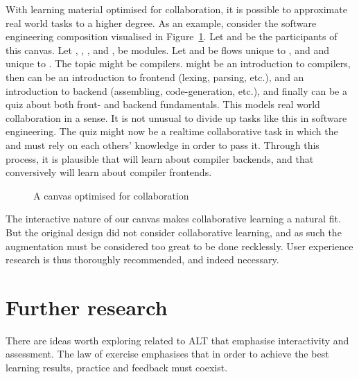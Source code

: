 \documentclass{article}
\begin{document}
\begin{multicols}{2}
With learning material optimised for collaboration, it is possible to 
approximate real world tasks to a higher degree. As an example, consider the 
software engineering composition visualised in Figure~\ref{collabcanvas}. Let 
 and  be the participants of this canvas. Let , , , and , be 
modules. Let  and  be flows unique to , and  and 
 unique to . The topic might be compilers.  might be an 
introduction to compilers, then  can be an introduction to frontend 
(lexing, parsing, etc.), and  an introduction to backend (assembling, 
code-generation, etc.), and finally  can be a quiz about both front- and 
backend fundamentals. This models real world collaboration in a sense. It is 
not unusual to divide up tasks like this in software engineering. The quiz 
might now be a realtime collaborative task in which the  and  must rely 
on each others' knowledge in order to pass it. Through this process, it is 
plausible that  will learn about compiler backends, and that conversively 
 will learn about compiler frontends.

\begin{figure}[H]
\begin{centering}
\caption{A canvas optimised for collaboration}
\label{collabcanvas}
\end{centering}
\end{figure}

The interactive nature of our canvas makes collaborative learning a natural 
fit. But the original design did not consider collaborative learning, and as 
such the augmentation must be considered too great to be done recklessly. User 
experience research is thus thoroughly recommended, and indeed necessary.
 
\section{Further research}
\label{further}
There are ideas worth exploring related to ALT that emphasise interactivity 
and assessment. The law of exercise emphasises that in order to achieve the 
best learning results, practice and feedback must 
coexist\cite{murphy2011games}.


\end{multicols}
\end{document}
